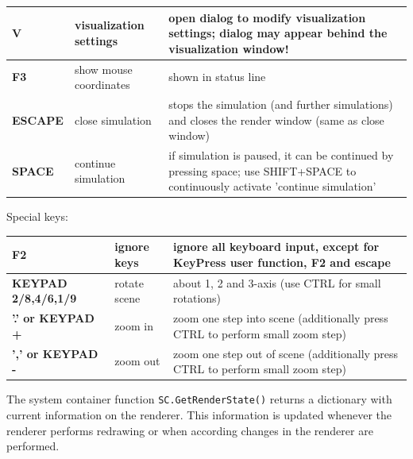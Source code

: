 \begin{center}
\begin{longtable}{| p{4cm} | p{4cm} | p{8cm} |}
	\bf V & visualization settings & open dialog to modify visualization settings; dialog may appear behind the visualization window! \\ \hline
	\bf F3 & show mouse coordinates & shown in status line \\ \hline
  \bf ESCAPE & close simulation & stops the simulation (and further simulations) and closes the render window (same as close window) \\ \hline
  \bf SPACE & continue simulation & if simulation is paused, it can be continued by pressing space; use SHIFT+SPACE to continuously activate 'continue simulation'\\ \hline
%
  \end{longtable}
\end{center}

Special keys:
\begin{center}
  \footnotesize
  \begin{longtable}{| p{4cm} | p{4cm} | p{8cm} |} 
	\hline
	\bf F2 & ignore keys & ignore all keyboard input, except for KeyPress user function, F2 and escape \\ \hline
  \bf KEYPAD 2/8,4/6,1/9 & rotate scene & about 1, 2 and 3-axis (use CTRL for small rotations) \\ \hline
  \bf '.' or KEYPAD + & zoom in & zoom one step into scene (additionally press CTRL to perform small zoom step)\\ \hline
  \bf ',' or KEYPAD - & zoom out & zoom one step out of scene (additionally press CTRL to perform small zoom step)\\ \hline
  \end{longtable}
\end{center}

\label{sec:renderState}
The system container function \texttt{SC.GetRenderState()} returns a dictionary with current information on the renderer.
This information is updated whenever the renderer performs redrawing or when according changes in the renderer are performed.

